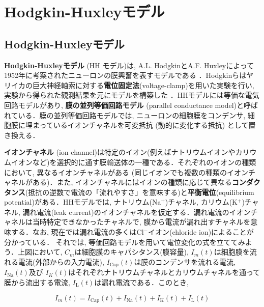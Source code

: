 \section{Hodgkin-Huxleyモデル}
\subsection{Hodgkin-Huxleyモデル}
\textbf{Hodgkin-Huxleyモデル} (HH モデル)は, A.L. HodgkinとA.F. Huxleyによって1952年に考案されたニューロンの膜興奮を表すモデルである \citep{Hodgkin1952-gy}．Hodgkinらはヤリイカの巨大神経軸索に対する\textbf{電位固定法}(voltage-clamp)を用いた実験を行い, 実験から得られた観測結果を元にモデルを構築した \citep{Schwiening2012-pi}．HHモデルには等価な電気回路モデルがあり, \textbf{膜の並列等価回路モデル} (parallel conductance model)と呼ばれている．膜の並列等価回路モデルでは, ニューロンの細胞膜をコンデンサ, 細胞膜に埋まっているイオンチャネルを可変抵抗 (動的に変化する抵抗) として置き換える．

\textbf{イオンチャネル} (ion channel)は特定のイオン(例えばナトリウムイオンやカリウムイオンなど)を選択的に通す膜輸送体の一種である．それぞれのイオンの種類において, 異なるイオンチャネルがある (同じイオンでも複数の種類のイオンチャネルがある)．また, イオンチャネルにはイオンの種類に応じて異なる\textbf{コンダクタンス}(抵抗の逆数で電流の「流れやすさ」を意味する)と\textbf{平衡電位}(equilibrium potential)がある．HHモデルでは, ナトリウム(Na$^{+}$)チャネル, カリウム(K$^{+}$)チャネル, 漏れ電流(leak current)のイオンチャネルを仮定する．漏れ電流のイオンチャネルは当時特定できなかったチャネルで, 膜から電流が漏れ出すチャネルを意味する．なお, 現在では漏れ電流の多くはCl$^{-}$イオン(chloride ion)によることが分かっている．
それでは, 等価回路モデルを用いて電位変化の式を立ててみよう．上図において, $C_m$は細胞膜のキャパシタンス(膜容量), $I_{m}(t)$は細胞膜を流れる電流(外部からの入力電流), $I_\text{Cap}(t)$は膜のコンデンサを流れる電流, $I_\text{Na}(t)$及び $I_K(t)$はそれぞれナトリウムチャネルとカリウムチャネルを通って膜から流出する電流, $I_\text{L}(t)$は漏れ電流である．このとき, 


\begin{equation}
I_{m}(t)=I_\text{Cap}(t)+I_\text{Na}(t)+I_\text{K}(t)+I_\text{L}(t)    
\end{equation}



